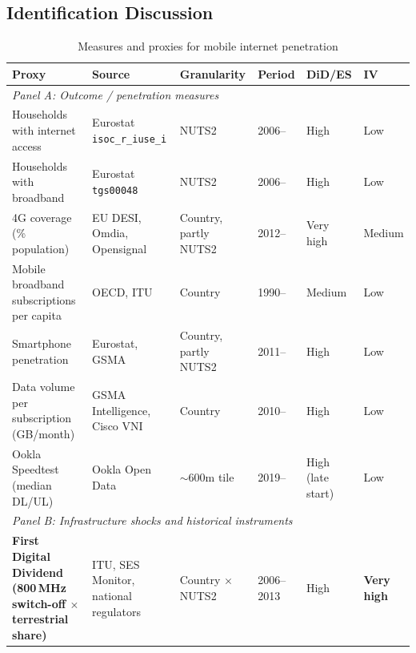 \documentclass[12pt, a4paper]{article}
\begin{document}
\subsection{Identification Discussion}
\begin{table}[H]
\centering
\footnotesize
\caption{Measures and proxies for mobile internet penetration}
\label{tab:internet_proxies}
\begin{tabular}{p{3.8cm} p{2.8cm} p{1.8cm} p{1.4cm} p{1.8cm} p{1.8cm}}
\hline\hline
\textbf{Proxy} & \textbf{Source} & \textbf{Granularity} & \textbf{Period} & \textbf{DiD/ES} & \textbf{IV} \\
\hline
\multicolumn{6}{l}{\textit{Panel A: Outcome / penetration measures}} \\[3pt]

Households with internet access & 
Eurostat \texttt{isoc\_r\_iuse\_i} & 
NUTS2 & 
2006-- & 
High & 
Low \\[4pt]

Households with broadband & 
Eurostat \texttt{tgs00048} & 
NUTS2 & 
2006-- & 
High & 
Low \\[4pt]

4G coverage (\% population) & 
EU DESI, Omdia, Opensignal & 
Country, partly NUTS2 & 
2012-- & 
Very high & 
Medium \\[4pt]

Mobile broadband subscriptions per capita & 
OECD, ITU & 
Country & 
1990-- & 
Medium & 
Low \\[4pt]

Smartphone penetration & 
Eurostat, GSMA & 
Country, partly NUTS2 & 
2011-- & 
High & 
Low \\[4pt]

Data volume per subscription (GB/month) & 
GSMA Intelligence, Cisco VNI & 
Country & 
2010-- & 
High & 
Low \\[4pt]

Ookla Speedtest (median DL/UL) & 
Ookla Open Data & 
$\sim$600m tile & 
2019-- & 
High (late start) & 
Low \\[6pt]

\hline
\multicolumn{6}{l}{\textit{Panel B: Infrastructure shocks and historical instruments}} \\[3pt]

\textbf{First Digital Dividend (800\,MHz switch-off $\times$ terrestrial share)} & 
ITU, SES Monitor, national regulators & 
Country $\times$ NUTS2 & 
2006--2013 & 
High & 
\textbf{Very high} \\[4pt]


\end{tabular}
\end{table}
\end{document}
